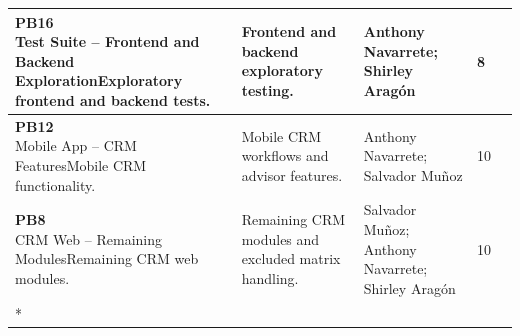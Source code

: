 \documentclass[letterpaper%
, oneside%
, 12pt%
, memoireprojet%
, english%
,creativecommons,hyperref, withAlgo2e %
]{thETS}
\newcommand{\tablelastrow}{%
    \\* \hline
}
\newcommand{\pbhu}[3]{%
    #1 &
    #2%
}
\begin{document}
\begin{longtable}{|L{1.0cm}|L{4.0cm}|L{5.4cm}|L{2.7cm}|L{1.3cm}|}
\hline
\pbhu{8}{\textbf{PB16}\newline Test Suite -- Frontend and Backend Exploration}{Exploratory frontend and backend tests.} & Frontend and backend exploratory testing. & Anthony Navarrete; Shirley Aragón & 8 \\
\hline
\pbhu{9}{\textbf{PB12}\newline Mobile App -- CRM Features}{Mobile CRM functionality.} & Mobile CRM workflows and advisor features. & Anthony Navarrete; Salvador Muñoz & 10 \\
\hline
\pbhu{10}{\textbf{PB8}\newline CRM Web -- Remaining Modules}{Remaining CRM web modules.} & Remaining CRM modules and excluded matrix handling. & Salvador Muñoz; Anthony Navarrete; Shirley Aragón & 10 \tablelastrow
\end{longtable}
\endgroup
\end{document}
